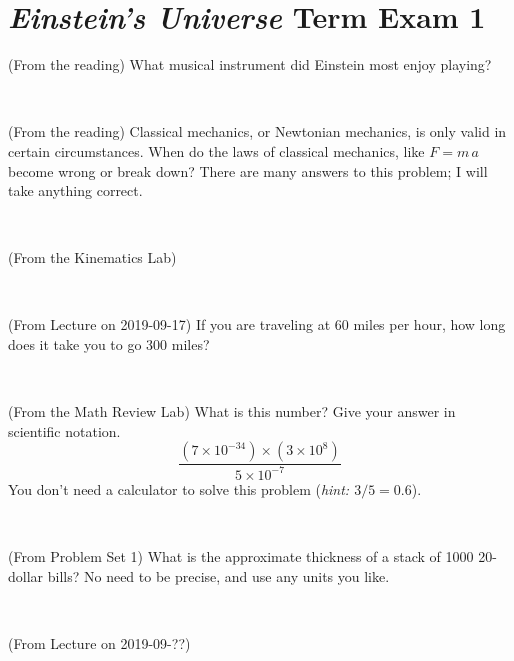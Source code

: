 \documentclass[12pt, letterpaper]{article}
\begin{document}
\section*{\textsl{Einstein's Universe} Term Exam 1}
\setcounter{problem}{1}


\begin{problem} (From the reading)
What musical instrument did Einstein most enjoy playing?
\end{problem}


\vfill ~

\begin{problem} (From the reading)
Classical mechanics, or Newtonian mechanics, is only valid in certain
circumstances. When do the laws of classical mechanics, like $F =
m\,a$ become wrong or break down? There are many answers to this
problem; I will take anything correct.
\end{problem}


\vfill ~

\begin{problem} (From the Kinematics Lab)

\end{problem}


\vfill ~

\begin{problem} (From Lecture on 2019-09-17)
If you are traveling at 60 miles per hour, how long does
it take you to go 300 miles?
\end{problem}


\vfill ~


\clearpage


\begin{problem} (From the Math Review Lab)
What is this number? Give your answer in scientific notation.
$$
\frac{(7\times10^{-34})\times(3\times10^8)}{5\times10^{-7}}
$$
You don't need a calculator to solve this problem (\textit{hint: $3/5=0.6$}).
\end{problem}


\vfill ~

\begin{problem} (From Problem Set 1)
What is the approximate thickness of a stack of 1000 20-dollar bills?
No need to be precise, and use any units you like.
\end{problem}


\vfill ~

\begin{problem} (From Lecture on 2019-09-??)
\end{problem}
\end{document}
